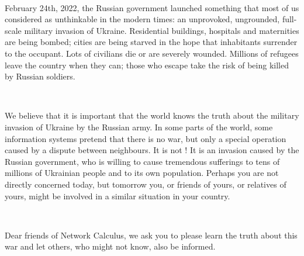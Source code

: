 ~\\
\par\indent February 24th, 2022, the Russian government launched something that most of us considered as unthinkable in the modern times: an unprovoked, ungrounded, full-scale military invasion of Ukraine. Residential buildings, hospitals and maternities are being bombed; cities are being starved in the hope that inhabitants surrender to the occupant. Lots of civilians die or are severely wounded. Millions of refugees leave the country when they can; those who escape take the risk of being killed by Russian soldiers.

~\\
\par\indent We believe that it is important that the world knows the truth about the military invasion of Ukraine by the Russian army. In some parts of the world, some information systems pretend that there is no war, but only a special operation caused by a dispute between neighbours. It is not ! It is an invasion caused by the Russian government, who is willing to cause tremendous sufferings to tens of millions of Ukrainian people and to its own population. Perhaps you are not directly concerned today, but tomorrow you, or friends of yours, or relatives of yours, might be involved in a similar situation in your country.

~\\
\par\indent Dear friends of Network Calculus, we ask you to please learn the truth about this war and let others, who might not know, also be informed.
~\\